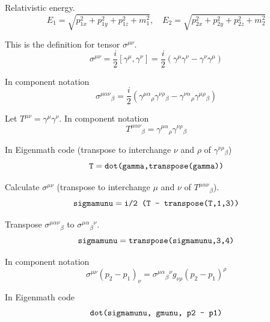 Relativistic energy.
\begin{equation*}
E_1=\sqrt{p_{1x}^2+p_{1y}^2+p_{1z}^2+m_1^2},\quad
E_2=\sqrt{p_{2x}^2+p_{2y}^2+p_{2z}^2+m_2^2}
\end{equation*}

This is the definition for tensor $\sigma^{\mu\nu}$.
\begin{equation*}
\sigma^{\mu\nu}=\frac{i}{2}\left[\gamma^\mu,\gamma^\nu\right]
=\frac{i}{2}\left(\gamma^\mu\gamma^\nu-\gamma^\nu\gamma^\mu\right)
\end{equation*}

In component notation
\begin{equation*}
\sigma^{\mu\alpha\nu}{}_\beta
=\frac{i}{2}\left(\gamma^{\mu\alpha}{}_\rho\gamma^{\nu\rho}{}_\beta
-\gamma^{\nu\alpha}{}_\rho\gamma^{\mu\rho}{}_\beta\right)
\end{equation*}

Let $T^{\mu\nu}=\gamma^\mu\gamma^\nu$.
In component notation
\begin{equation*}
T^{\mu\alpha\nu}{}_\beta
=\gamma^{\mu\alpha}{}_\rho\gamma^{\nu\rho}{}_\beta
\end{equation*}

In Eigenmath code (transpose to interchange $\nu$ and $\rho$ of $\gamma^{\nu\rho}{}_\beta$)
\begin{equation*}
\text{\ttfamily T}=\text{\ttfamily dot(gamma,transpose(gamma))}
\end{equation*}

Calculate $\sigma^{\mu\nu}$ (transpose to interchange $\mu$ and $\nu$ of $T^{\mu\alpha\nu}{}_\beta$).
\begin{equation*}
\text{\ttfamily sigmamunu}=\text{\ttfamily i/2 (T - transpose(T,1,3))}
\end{equation*}

Transpose $\sigma^{\mu\alpha\nu}{}_\beta$ to $\sigma^{\mu\alpha}{}_\beta{}^\nu$.
\begin{equation*}
\text{\ttfamily sigmamunu}=\text{\ttfamily transpose(sigmamunu,3,4)}
\end{equation*}

In component notation
\begin{equation*}
\sigma^{\mu\nu}(p_2-p_1)_\nu
=\sigma^{\mu\alpha}{}_\beta{}^{\nu}g_{\nu\rho}(p_2-p_1)^\rho
\end{equation*}

In Eigenmath code
\begin{equation*}
\text{\ttfamily dot(sigmamunu, gmunu, p2 - p1)}
\end{equation*}



